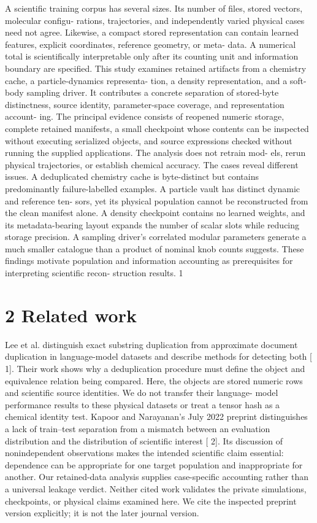 \documentclass[11pt]{article}
\begin{document}
A scientific training corpus has several sizes. Its number of files, stored vectors, molecular configu-
rations, trajectories, and independently varied physical cases need not agree. Likewise, a compact
stored representation can contain learned features, explicit coordinates, reference geometry, or meta-
data. A numerical total is scientifically interpretable only after its counting unit and information
boundary are specified.
This study examines retained artifacts from a chemistry cache, a particle-dynamics representa-
tion, a density representation, and a soft-body sampling driver. It contributes a concrete separation
of stored-byte distinctness, source identity, parameter-space coverage, and representation account-
ing. The principal evidence consists of reopened numeric storage, complete retained manifests, a
small checkpoint whose contents can be inspected without executing serialized objects, and source
expressions checked without running the supplied applications. The analysis does not retrain mod-
els, rerun physical trajectories, or establish chemical accuracy.
The cases reveal different issues. A deduplicated chemistry cache is byte-distinct but contains
predominantly failure-labelled examples. A particle vault has distinct dynamic and reference ten-
sors, yet its physical population cannot be reconstructed from the clean manifest alone. A density
checkpoint contains no learned weights, and its metadata-bearing layout expands the number of
scalar slots while reducing storage precision. A sampling driver’s correlated modular parameters
generate a much smaller catalogue than a product of nominal knob counts suggests. These findings
motivate population and information accounting as prerequisites for interpreting scientific recon-
struction results.
1


\section*{2 Related work}

Lee et al. distinguish exact substring duplication from approximate document duplication in
language-model datasets and describe methods for detecting both [ 1]. Their work shows why a
deduplication procedure must define the object and equivalence relation being compared. Here, the
objects are stored numeric rows and scientific source identities. We do not transfer their language-
model performance results to these physical datasets or treat a tensor hash as a chemical identity
test.
Kapoor and Narayanan’s July 2022 preprint distinguishes a lack of train–test separation from
a mismatch between an evaluation distribution and the distribution of scientific interest [ 2]. Its
discussion of nonindependent observations makes the intended scientific claim essential: dependence
can be appropriate for one target population and inappropriate for another. Our retained-data
analysis supplies case-specific accounting rather than a universal leakage verdict. Neither cited
work validates the private simulations, checkpoints, or physical claims examined here. We cite the
inspected preprint version explicitly; it is not the later journal version.
\end{document}
